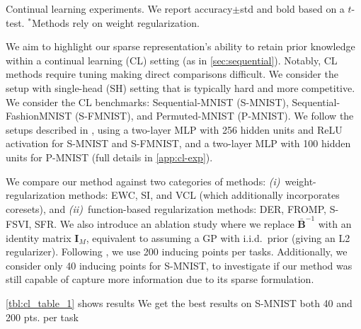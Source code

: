 \documentclass{article}
\newlength{\tblw}
\newcommand{\mbf}[1]{\mathbf{#1}}
\newcommand{\MB}{\mbf{B}}
\newcommand{\MI}{\mbf{I}}
\begin{document}
\setlength{\columnsep}{8pt}
\setlength{\intextsep}{0pt}
\begin{wraptable}{R}{.65\textwidth}
  \centering\scriptsize
  \caption{Continual learning experiments. We report accuracy${\pm}$std and bold based on a $t$-test. $^*$Methods rely on weight regularization.}
	\label{tbl:cl_table_1}
	
	\renewcommand{\arraystretch}{1.}
	\setlength{\tabcolsep}{1pt}
	\setlength{\tblw}{0.14\textwidth}  
	
	\newcommand{\val}[2]{%
		$#1$\textcolor{gray}{\tiny ${\pm}#2$}
	} 
	
	\vspace*{-4pt}
	
	
\end{wraptable}
%
We aim to highlight our sparse representation's ability to retain prior knowledge within a continual learning (CL) setting (as in \cref{sec:sequential}). Notably, CL methods require tuning making direct comparisons difficult. We consider the setup with single-head (SH) setting that is typically hard and more competitive.
%
We consider the CL benchmarks: Sequential-MNIST (S-MNIST), Sequential-FashionMNIST (S-FMNIST), and Permuted-MNIST (P-MNIST). We follow the setups described in \cite{rudner2022continual, pan2020continual}, using a two-layer MLP with 256 hidden units and ReLU activation for S-MNIST and S-FMNIST, and a two-layer MLP with 100 hidden units for P-MNIST (full details in \cref{app:cl-exp}).

We compare our method against two categories of methods: {\em (i)}~weight-regularization methods: EWC, SI, and VCL (which additionally incorporates coresets), and {\em(ii)}~function-based regularization methods: DER, FROMP, S-FSVI, SFR. We also introduce an ablation study where we replace $\bar{\MB}^{-1}$ with an identity matrix $\MI_M$, equivalent to assuming a GP with i.i.d.\ prior (giving an L2 regularizer).
Following \cite{rudner2022continual}, we use 200 inducing points per tasks. Additionally,  we consider only 40 inducing points for S-MNIST, to investigate if our method was still capable of capture more information due to its sparse formulation.

\cref{tbl:cl_table_1} shows results
We get the best results on S-MNIST both 40 and 200 pts. per task
\end{document}
